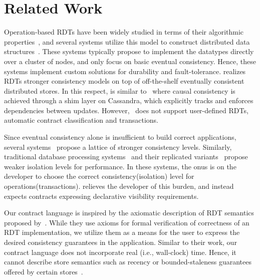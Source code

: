 \section{Related Work}
\label{sec:related}

Operation-based RDTs have been widely studied in terms of their algorithmic
properties~\cite{SSS,Burckhardt2014}, and several systems utilize this model to
construct distributed data structures~\cite{Cassandra,Bayou,Tango}. These
systems typically propose to implement the datatypes directly over a cluster of
nodes, and only focus on basic eventual consistency. Hence, these systems
implement custom solutions for durability and fault-tolerance. \name realizes
RDTs stronger consistency models on top of off-the-shelf eventually consistent
distributed stores. In this respect, \name is similar to~\cite{BoltOn} where
causal consistency is achieved through a shim layer on Cassandra, which
explicitly tracks and enforces dependencies between updates.
However,~\cite{BoltOn} does not support user-defined RDTs, automatic contract
classification and transactions.

Since eventual consistency alone is insufficient to build correct applications,
several systems~\cite{Bayou,Pileus,RedBlue} propose a lattice of stronger
consistency levels. Similarly, traditional database processing
systems~\cite{Berenson95} and their replicated variants~\cite{BailisHAT}
propose weaker isolation levels for performance. In these systems, the onus is
on the developer to choose the correct consistency(isolation) level for
operations(transactions). \name relieves the developer of this burden, and
instead expects contracts expressing declarative visibility requirements.

Our contract language is inspired by the axiomatic description of RDT semantics
proposed by~\cite{Burckhardt2014}. While they use axioms for formal
verification of correctness of an RDT implementation, we utilize them as a
means for the user to express the desired consistency guarantees in the
application. Similar to their work, our contract language does not incorporate
real (i.e., wall-clock) time. Hence, it cannot describe store semantics such as
recency or bounded-staleness guarantees offered by certain
stores~\cite{Pileus}.

